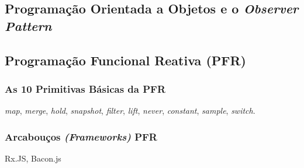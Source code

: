 %

\subsection{Programação Orientada a Objetos e o \emph{Observer Pattern}}


\subsection{Programação Funcional Reativa (PFR)}
\label{sec:pfr}




\subsubsection{As 10 Primitivas Básicas da PFR}
\label{sec:pfr-10-primitivas}

\emph{map}, \emph{merge}, \emph{hold}, \emph{snapshot}, \emph{filter},
\emph{lift}, \emph{never}, \emph{constant}, \emph{sample}, \emph{switch}.


\subsubsection{Arcabouços \emph{(Frameworks)} PFR}
\label{sec:pfr-frameworks}

Rx.JS, Bacon.js

